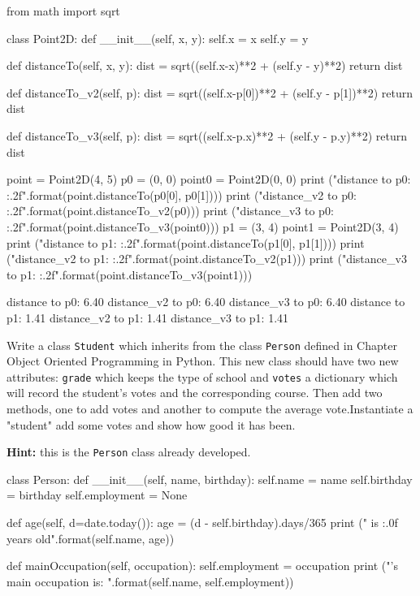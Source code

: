 \cprotEnv\begin{solution}
\begin{ipython}
from math import sqrt

class Point2D:
    def __init__(self, x, y):
        self.x = x
        self.y = y

    def distanceTo(self, x, y):
        dist = sqrt((self.x-x)**2 + (self.y - y)**2)
        return dist

    def distanceTo_v2(self, p):
        dist = sqrt((self.x-p[0])**2 + (self.y - p[1])**2)
        return dist

    def distanceTo_v3(self, p):
        dist = sqrt((self.x-p.x)**2 + (self.y - p.y)**2)
        return dist

point = Point2D(4, 5)
p0 = (0, 0)
point0 = Point2D(0, 0)
print ("distance to p0: {:.2f}".format(point.distanceTo(p0[0], p0[1])))
print ("distance_v2 to p0: {:.2f}".format(point.distanceTo_v2(p0)))
print ("distance_v3 to p0: {:.2f}".format(point.distanceTo_v3(point0)))
p1 = (3, 4)
point1 = Point2D(3, 4)
print ("distance to p1: {:.2f}".format(point.distanceTo(p1[0], p1[1])))
print ("distance_v2 to p1: {:.2f}".format(point.distanceTo_v2(p1)))
print ("distance_v3 to p1: {:.2f}".format(point.distanceTo_v3(point1)))
\end{ipython}
\begin{ioutput}
distance to p0: 6.40
distance\_v2 to p0: 6.40
distance\_v3 to p0: 6.40
distance to p1: 1.41
distance\_v2 to p1: 1.41
distance\_v3 to p1: 1.41
\end{ioutput}
\end{solution}

\cprotEnv\begin{question}
Write a class \texttt{Student} which inherits from the class \texttt{Person} defined in Chapter Object Oriented Programming in Python. This new class should have two new attributes: \texttt{grade} which keeps the type of school and \texttt{votes} a dictionary which will record the student's votes and the corresponding course. Then add two methods, one to add votes and another to compute the average vote.Instantiate a "student" add some votes and show how good it has been.

\noindent\textbf{Hint:} this is the \texttt{Person} class already developed.

\begin{ipython}
class Person:
    def __init__(self, name, birthday):
        self.name = name
        self.birthday = birthday
        self.employment = None

    def age(self, d=date.today()):
        age = (d - self.birthday).days/365
        print ("{} is {:.0f} years old".format(self.name, age))

    def mainOccupation(self, occupation):
        self.employment = occupation
        print ("{}'s main occupation is: {}".format(self.name, self.employment))
\end{ipython}
\end{question}

